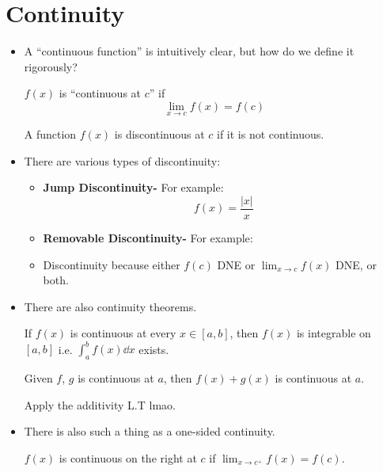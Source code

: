 \section{Continuity}
\begin{itemize}
    \item A ``continuous function'' is intuitively clear, but how do we define it rigorously?
    \begin{definition}
        $f(x)$ is ``continuous at $c$'' if
        \begin{equation}
            \lim_{x\to c}f(x)=f(c)
            \label{eq:}
        \end{equation}
    \end{definition}
    \begin{definition}
        A function $f(x)$ is discontinuous at $c$ if it is not continuous.
    \end{definition}
    \item There are various types of discontinuity:
    \begin{itemize}
        \item \textbf{Jump Discontinuity-} For example:
        \begin{equation}
            f(x)=\frac{|x|}{x}
            \label{eq:}
        \end{equation}
        \item \textbf{Removable Discontinuity-} For example:
        \item Discontinuity because either $f(c)$ DNE or $\displaystyle \lim_{x\to c} f(x)$ DNE, or both.
    \end{itemize}
    \item There are also continuity theorems.
    \begin{theorem}
        If $f(x)$ is continuous at every $x\in[a,b]$, then $f(x)$ is integrable on $[a,b]$ i.e. $\int_a^b f(x) \dd{x}$ exists.
    \end{theorem}
    \begin{theorem}
        Given $f$, $g$ is continuous at $a$, then $f(x)+g(x)$ is continuous at $a$.
    \end{theorem}
    \begin{prooof}
        Apply the additivity L.T lmao.
    \end{prooof}
    \item There is also such a thing as a one-sided continuity.
    \begin{definition}
        $f(x)$ is continuous on the right at $c$ if $\displaystyle\lim_{x\to c^+}f(x)=f(c)$.

\end{definition}
\end{itemize}
